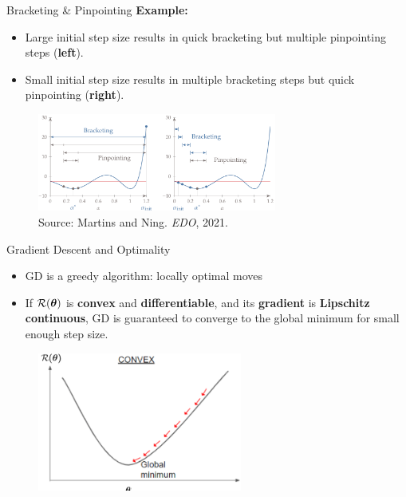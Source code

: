 \documentclass[11pt,compress,t,notes=noshow, xcolor=table]{beamer}
\begin{document}
    \begin{vbframe}{Bracketing \& Pinpointing}
        \textbf{Example:}
        \begin{itemize}
            \item Large initial step size results in quick bracketing but multiple pinpointing steps (\textbf{left}).
            \item Small initial step size results in multiple bracketing steps but quick pinpointing (\textbf{right}).
        \end{itemize}
        \begin{figure}
            \centering
            \includegraphics[width=0.7\textwidth]{figure_man/bracketing-pinpointing-example.png}
            \caption*{Source: Martins and Ning. \textit{EDO}, 2021.}
        \end{figure}
    \end{vbframe}

	\begin{vbframe}{Gradient Descent and Optimality}
	
	\begin{itemize}
		\item GD is a greedy algorithm: locally optimal moves
		\medskip
		\item If $\mathcal{R}(\bm{\theta})$ is \textbf{convex} and \textbf{differentiable}, and its \textbf{gradient} is \textbf{Lipschitz continuous}, GD is guaranteed to converge to the global minimum for small enough step size.
	\end{itemize}
	
	\begin{figure}
		\centering
		\includegraphics[width=0.6\textwidth]{figure_man/gdes_1.png}
	\end{figure}

	\end{vbframe}
			
	
	
	\endlecture
\end{document}
